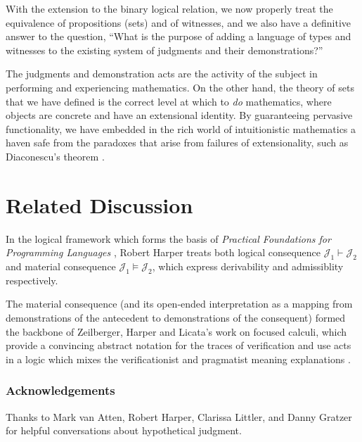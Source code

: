 \documentclass[11pt]{amsart}
\theoremstyle{definition}
\theoremstyle{remark}
\numberwithin{equation}{section}
\newcommand\JJ{\mathcal{J}}
\begin{document}
With the extension to the binary logical relation, we now properly treat the
equivalence of propositions (sets) and of witnesses, and we also have a
definitive answer to the question, ``What is the purpose of adding a language of
types and witnesses to the existing system of judgments and their
demonstrations?''

The judgments and demonstration acts are the activity of the subject in
performing and experiencing mathematics. On the other hand, the theory of sets
that we have defined is the correct level at which to \emph{do} mathematics,
where objects are concrete and have an extensional identity. By guaranteeing
pervasive functionality, we have embedded in the rich world of intuitionistic
mathematics a haven safe from the paradoxes that arise from failures of
extensionality, such as Diaconescu's theorem \cite{sterling:diaconescu}.

\section{Related Discussion}

In the logical framework which forms the basis of \emph{Practical Foundations
for Programming Languages} \cite{PFPL}, Robert Harper treats both logical
consequence $\JJ_1\vdash\JJ_2$ and material consequence $\JJ_1\vDash\JJ_2$,
which express derivability and admissiblity respectively.

The material consequence (and its open-ended interpretation as a mapping from
demonstrations of the antecedent to demonstrations of the consequent) formed the
backbone of Zeilberger, Harper and Licata's work on focused calculi, which
provide a convincing abstract notation for the traces of verification and use
acts in a logic which mixes the verificationist and pragmatist meaning
explanations \cite{zeilberger:thesis, licata-zeilberger-harper:focusing,
zeilberger:2008}.


\subsubsection*{Acknowledgements}

Thanks to Mark van Atten, Robert Harper, Clarissa Littler, and Danny Gratzer for
helpful conversations about hypothetical judgment.

\newpage


\end{document}
